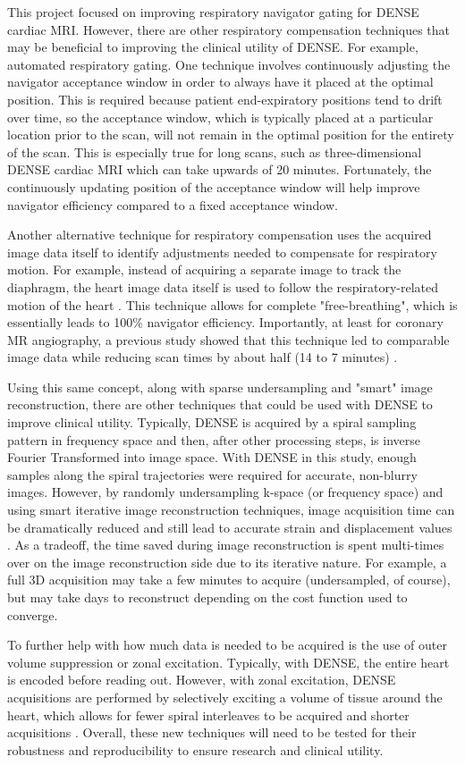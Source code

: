 	This project focused on improving respiratory navigator gating for DENSE cardiac MRI. However, there are other respiratory compensation techniques that may be beneficial to improving the clinical utility of DENSE. For example, automated respiratory gating. One technique involves continuously adjusting the navigator acceptance window in order to always have it placed at the optimal position. This is required because patient end-expiratory positions tend to drift over time, so the acceptance window, which is typically placed at a particular location prior to the scan, will not remain in the optimal position for the entirety of the scan. This is especially true for long scans, such as three-dimensional DENSE cardiac MRI which can take upwards of 20 minutes. Fortunately, the continuously updating position of the acceptance window will help improve navigator efficiency compared to a fixed acceptance window.
	
	Another alternative technique for respiratory compensation uses the acquired image data itself to identify adjustments needed to compensate for respiratory motion. For example, instead of acquiring a separate image to track the diaphragm, the heart image data itself is used to follow the respiratory-related motion of the heart \cite{Pang2014}. This technique allows for complete "free-breathing", which is essentially leads to 100\% navigator efficiency. Importantly, at least for coronary MR angiography, a previous study showed that this technique led to comparable image data while reducing scan times by about half (14 to 7 minutes) \cite{Pang2014}.
	
	Using this same concept, along with sparse undersampling and "smart" image reconstruction, there are other techniques that could be used with DENSE to improve clinical utility. Typically, DENSE is acquired by a spiral sampling pattern in frequency space and then, after other processing steps, is inverse Fourier Transformed into image space. With DENSE in this study, enough samples along the spiral trajectories were required for accurate, non-blurry images. However, by randomly undersampling k-space (or frequency space) and using smart iterative image reconstruction techniques, image acquisition time can be dramatically reduced and still lead to accurate strain and displacement values \cite{Chen2013}. As a tradeoff, the time saved during image reconstruction is spent multi-times over on the image reconstruction side due to its iterative nature. For example, a full 3D acquisition may take a few minutes to acquire (undersampled, of course), but may take days to reconstruct depending on the cost function used to converge.
	
	To further help with how much data is needed to be acquired is the use of outer volume suppression or zonal excitation. Typically, with DENSE, the entire heart is encoded before reading out. However, with zonal excitation, DENSE acquisitions are performed by selectively exciting a volume of tissue around the heart, which allows for fewer spiral interleaves to be acquired and shorter acquisitions \cite{Scott2016}. Overall, these new techniques will need to be tested for their robustness and reproducibility to ensure research and clinical utility.

	
	
	